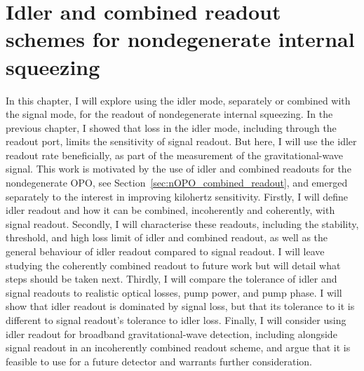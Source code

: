 \chapter{Idler and combined readout schemes for nondegenerate internal squeezing}
\label{chp:idler_readout}

In this chapter, I will explore using the idler mode, separately or combined with the signal mode, for the readout of nondegenerate internal squeezing. In the previous chapter, I showed that loss in the idler mode, including through the readout port, limits the sensitivity of signal readout. But here, I will use the idler readout rate beneficially, as part of the measurement of the gravitational-wave signal. This work is motivated by the use of idler and combined readouts for the nondegenerate OPO, see Section~\ref{sec:nOPO_combined_readout}, and emerged separately to the interest in improving kilohertz sensitivity.
Firstly, I will define idler readout and how it can be combined, incoherently and coherently, with signal readout. %
Secondly, I will characterise these readouts, including the stability, threshold, and high loss limit of idler and combined readout, as well as the general behaviour of idler readout compared to signal readout. I will leave studying the coherently combined readout to future work but will detail what steps should be taken next.
Thirdly, I will compare the tolerance of idler and signal readouts to realistic optical losses, pump power, and pump phase. I will show that idler readout is dominated by signal loss, but that its tolerance to it is different to signal readout's tolerance to idler loss.  
Finally, I will consider using idler readout for broadband gravitational-wave detection, including alongside signal readout in an incoherently combined readout scheme, and argue that it is feasible to use for a future detector and warrants further consideration.


